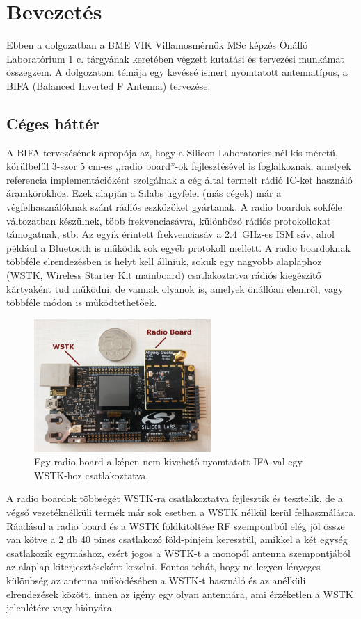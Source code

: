 \chapter{Bevezetés}
Ebben a dolgozatban a BME VIK Villamosmérnök MSc képzés Önálló Laboratórium 1 c. tárgyának keretében végzett kutatási és tervezési munkámat összegzem. A dolgozatom témája egy kevéssé ismert nyomtatott antennatípus, a BIFA (Balanced Inverted F Antenna) tervezése.
\section{Céges háttér}
A BIFA tervezésének apropója az, hogy a Silicon Laboratories-nél kis méretű, körülbelül 3-szor 5 cm-es ,,radio board''-ok fejlesztésével is foglalkoznak, amelyek referencia implementációként szolgálnak a cég által termelt rádió IC-ket használó áramkörökhöz. Ezek alapján a Silabs ügyfelei (más cégek) már a végfelhasználóknak szánt rádiós eszközöket gyártanak. A radio boardok sokféle változatban készülnek, több frekvenciasávra, különböző rádiós protokollokat támogatnak, stb. Az egyik érintett frekvenciasáv a \SI{2,4}{GHz}-es ISM sáv, ahol például a Bluetooth is működik sok egyéb protokoll mellett. A radio boardoknak többféle elrendezésben is helyt kell állniuk, sokuk egy nagyobb alaplaphoz (WSTK, Wireless Starter Kit mainboard) csatlakoztatva rádiós kiegészítő kártyaként tud működni, de vannak olyanok is, amelyek önállóan elemről, vagy többféle módon is működtethetőek.
\begin{figure}[h]
	\centering
	\includegraphics[width=0.6\textwidth]{kep/wstk-rb.jpg}
	\caption{Egy radio board a képen nem kivehető nyomtatott IFA-val egy WSTK-hoz csatlakoztatva.}
	\label{fig:wstk-rb}
\end{figure}
\par A radio boardok többségét WSTK-ra csatlakoztatva fejlesztik és tesztelik, de a végső vezetéknélküli termék már sok esetben a WSTK nélkül kerül felhasználásra. Ráadásul a radio board és a WSTK földkitöltése RF szempontból elég jól össze van kötve a 2 db 40 pines csatlakozó föld-pinjein keresztül, amikkel a két egység csatlakozik egymáshoz, ezért jogos a WSTK-t a monopól antenna szempontjából az alaplap kiterjesztéseként kezelni. Fontos tehát, hogy ne legyen lényeges különbség az antenna működésében a WSTK-t használó és az anélküli elrendezések között, innen az igény egy olyan antennára, ami érzéketlen a WSTK jelenlétére vagy hiányára.
